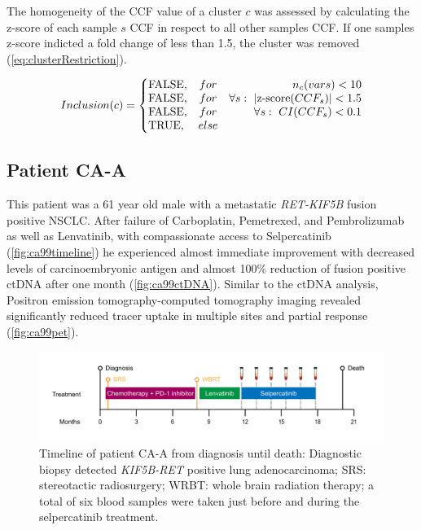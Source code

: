 The homogeneity of the CCF value of a cluster $c$ was assessed by calculating the z-score of each sample $s$ CCF in respect to all other samples CCF. If one samples z-score indicted a fold change of less than 1.5, the cluster was removed (\autoref{eq:clusterRestriction}).

\begin{equation}
Inclusion(c) = 
	\left\{ 
	\begin{array}{@{}lcr@{}}
		\text{FALSE,} & for & n_c(vars) < 10 \\
	 	\text{FALSE,} & for & \forall s:\ | \text{z-score}(CCF_s) | < 1.5 \\
		\text{FALSE,} & for &\forall s:\ CI(CCF_s) < 0.1 \\
		\text{TRUE,} & else &\\
\end{array} \right. 
\label{eq:clusterRestriction}
\end{equation}
\myequation[\ref{eq:clusterRestriction}]{Inclusion criteria for cluster of PhylogicNDT analysis}


\clearpage

\subsection{Patient CA-A}
\label{cascade-sec:CA99}

This patient was a 61 year old male  with a metastatic \textit{RET-KIF5B} fusion positive NSCLC. After failure of Carboplatin, Pemetrexed, and Pembrolizumab as well as Lenvatinib, with compassionate access to Selpercatinib (\autoref{fig:ca99timeline}) he experienced almost immediate improvement with decreased levels of carcinoembryonic antigen and almost 100\% reduction of fusion positive ctDNA after one month (\autoref{fig:ca99ctDNA}). Similar to the ctDNA analysis, Positron emission tomography-computed tomography imaging revealed significantly reduced tracer uptake in multiple sites and partial response (\autoref{fig:ca99pet}).

\begin{figure}[ht]
\centering
\includegraphics[width=.99\linewidth]{Figures/CASCADE/CA99/CA-A_timeline}
\caption[Timeline of patient CA-A from diagnosis until death]{Timeline of patient CA-A from diagnosis until death: Diagnostic biopsy detected \textit{KIF5B-RET} positive lung adenocarcinoma; SRS: stereotactic radiosurgery; WRBT: whole brain radiation therapy; a total of six blood samples were taken just before and during the selpercatinib treatment.} \label{fig:ca99timeline}
\end{figure}


